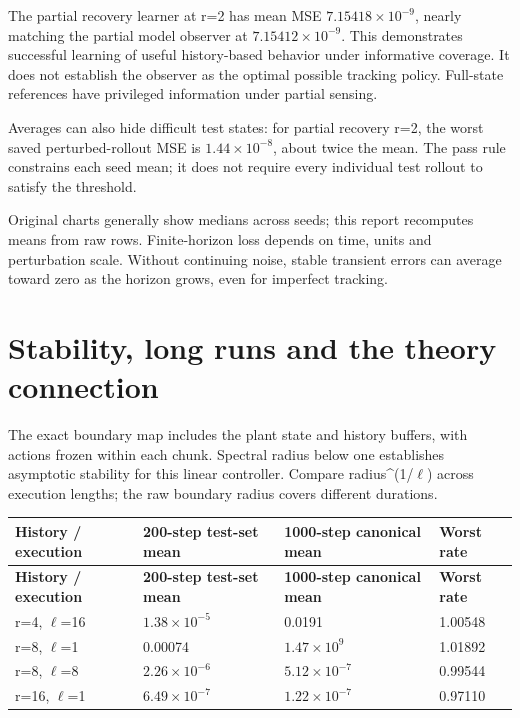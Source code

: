 \documentclass{l4dc2026}
\begin{document}
The partial recovery learner at r=2 has mean MSE $7.15418\times10^{-9}$, nearly matching the partial model observer at $7.15412\times10^{-9}$. This demonstrates successful learning of useful history-based behavior under informative coverage. It does not establish the observer as the optimal possible tracking policy. Full-state references have privileged information under partial sensing.

{\small Averages can also hide difficult test states: for partial recovery r=2, the worst saved perturbed-rollout MSE is $1.44\times10^{-8}$, about twice the mean. The pass rule constrains each seed mean; it does not require every individual test rollout to satisfy the threshold.\par}

{\small Original charts generally show medians across seeds; this report recomputes means from raw rows. Finite-horizon loss depends on time, units and perturbation scale. Without continuing noise, stable transient errors can average toward zero as the horizon grows, even for imperfect tracking.\par}

\section{Stability, long runs and the theory connection}
The exact boundary map includes the plant state and history buffers, with actions frozen within each chunk. Spectral radius below one establishes asymptotic stability for this linear controller. Compare radius\textasciicircum{}(1/$\ell$) across execution lengths; the raw boundary radius covers different durations.

{\small\setlength{\tabcolsep}{3pt}
\begin{longtable}{@{}p{}p{}p{}p{}@{}}
\toprule
\textbf{History / execution} & \textbf{200-step test-set mean} & \textbf{1000-step canonical mean} & \textbf{Worst rate} \\
\midrule\endfirsthead
\toprule
\textbf{History / execution} & \textbf{200-step test-set mean} & \textbf{1000-step canonical mean} & \textbf{Worst rate} \\
\midrule\endhead
\bottomrule\endfoot
r=4, $\ell$=16 & $1.38\times10^{-5}$ & 0.0191 & 1.00548 \\
r=8, $\ell$=1 & 0.00074 & $1.47\times10^{9}$ & 1.01892 \\
r=8, $\ell$=8 & $2.26\times10^{-6}$ & $5.12\times10^{-7}$ & 0.99544 \\
r=16, $\ell$=1 & $6.49\times10^{-7}$ & $1.22\times10^{-7}$ & 0.97110 \\
\end{longtable}}
\end{document}

